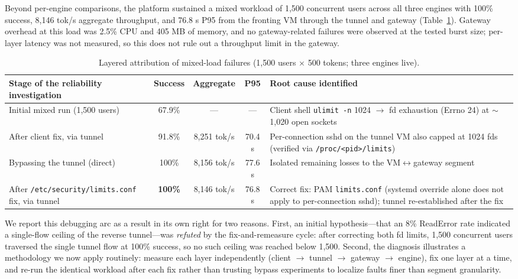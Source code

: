 \documentclass[11pt]{article}
\newcommand{\tps}{tok/s\xspace}
\begin{document}
Beyond per-engine comparisons, the platform sustained a mixed workload of 1,500 concurrent users across all three engines with 100\% success, 8,146 \tps{} aggregate throughput, and 76.8 s P95 from the fronting VM through the tunnel and gateway (Table~\ref{tab:reliability}). Gateway overhead at this load was 2.5\% CPU and 405 MB of memory, and no gateway-related failures were observed at the tested burst size; per-layer latency was not measured, so this does not rule out a throughput limit in the gateway.

\begin{table}[t]
\centering
\footnotesize
\begin{tabularx}{\textwidth}{>{\raggedright\arraybackslash}Xccc>{\raggedright\arraybackslash}p{4.9cm}}
\toprule
\textbf{Stage of the reliability investigation} & \textbf{Success} & \textbf{Aggregate} & \textbf{P95} & \textbf{Root cause identified} \\
\midrule
Initial mixed run (1,500 users) & 67.9\% & --- & --- & Client shell \texttt{ulimit -n} 1024 $\rightarrow$ fd exhaustion (Errno 24) at $\sim$1,020 open sockets \\
After client fix, via tunnel & 91.8\% & 8,251 \tps & 70.4 s & Per-connection sshd on the tunnel VM also capped at 1024 fds (verified via \texttt{/proc/<pid>/limits}) \\
Bypassing the tunnel (direct) & 100\% & 8,156 \tps & 77.6 s & Isolated remaining losses to the VM$\leftrightarrow$gateway segment \\
After \texttt{/etc/security/limits.conf} fix, via tunnel & \textbf{100\%} & 8,146 \tps & 76.8 s & Correct fix: PAM \texttt{limits.conf} (systemd override alone does not apply to per-connection sshd); tunnel re-established after the fix \\
\bottomrule
\end{tabularx}
\caption{Layered attribution of mixed-load failures (1,500 users $\times$ 500 tokens; three engines live).}
\label{tab:reliability}
\end{table}

We report this debugging arc as a result in its own right for two reasons. First, an initial hypothesis---that an 8\% ReadError rate indicated a single-flow ceiling of the reverse tunnel---was \emph{refuted} by the fix-and-remeasure cycle: after correcting both fd limits, 1,500 concurrent users traversed the single tunnel flow at 100\% success, so no such ceiling was reached below 1,500. Second, the diagnosis illustrates a methodology we now apply routinely: measure each layer independently (client $\rightarrow$ tunnel $\rightarrow$ gateway $\rightarrow$ engine), fix one layer at a time, and re-run the identical workload after each fix rather than trusting bypass experiments to localize faults finer than segment granularity.
\end{document}
